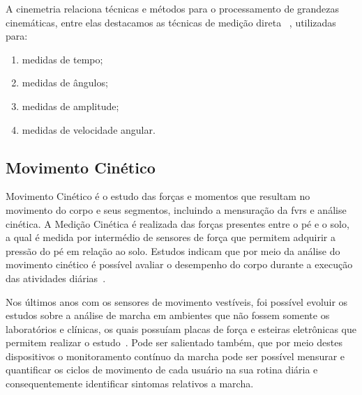 A cinemetria relaciona técnicas e métodos para o processamento de grandezas cinemáticas, entre elas destacamos as técnicas de medição direta ~\cite{biomecanica99}, utilizadas para: 
\begin{enumerate}
	\item medidas de tempo;
	\item medidas de ângulos;
	\item medidas de amplitude;
	\item medidas de velocidade angular.
\end{enumerate}

\subsection{Movimento Cinético}
Movimento Cinético é o estudo das forças e momentos que resultam no movimento do corpo e seus segmentos, incluindo a mensuração da \ac{fvrs} e análise cinética. A Medição Cinética é realizada das forças presentes entre o pé e o solo, a qual é medida por intermédio de sensores de força que permitem adquirir a pressão do pé em relação ao solo. Estudos indicam que por meio da análise do movimento cinético é possível avaliar o desempenho do corpo durante a execução das atividades diárias~\cite{gaitusingsensorsreview2012}.

Nos últimos anos com os sensores de movimento vestíveis, foi possível evoluir os estudos sobre a análise de marcha em ambientes que não fossem somente os laboratórios e clínicas, os quais possuíam placas de força e esteiras eletrônicas que permitem realizar o estudo~\cite{gaitusingsensorsreview2012}. Pode ser salientado também, que por meio destes dispositivos o monitoramento contínuo da marcha pode ser possível mensurar e quantificar os ciclos de movimento de cada usuário na sua rotina diária e consequentemente identificar sintomas relativos a marcha.



